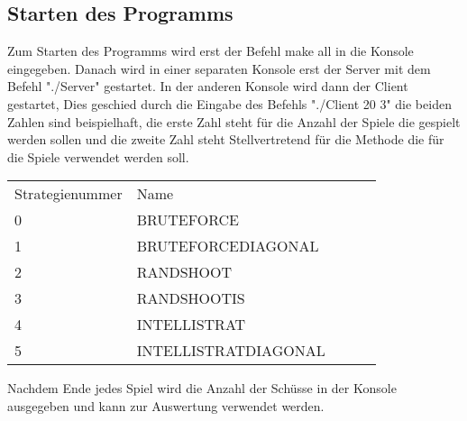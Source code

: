 \subsection{Starten des Programms}
Zum Starten des Programms wird erst der Befehl make all in die Konsole eingegeben. Danach wird in einer separaten Konsole erst der Server mit dem Befehl "./Server" gestartet. In der 
anderen Konsole wird dann der Client gestartet, Dies geschied durch die Eingabe des Befehls "./Client 20 3" die beiden Zahlen sind beispielhaft, die erste Zahl steht für die Anzahl 
der Spiele die gespielt werden sollen und die zweite Zahl steht Stellvertretend für die Methode die für die Spiele verwendet werden soll.

\begin{table}[h]
    \begin{tabular}{lllll}
     Strategienummer & Name &  &  &  \\
     0 & BRUTEFORCE &  &  &  \\
     1 & BRUTEFORCEDIAGONAL &  &  &  \\
     2 & RANDSHOOT &  &  &  \\
     3 & RANDSHOOTIS &  &  &  \\
     4 & INTELLISTRAT &  &  &  \\ 
     5 & INTELLISTRATDIAGONAL &  &  & 
    \end{tabular}
    \end{table}

Nachdem Ende jedes Spiel wird die Anzahl der Schüsse in der Konsole ausgegeben und kann zur Auswertung verwendet 
werden.



